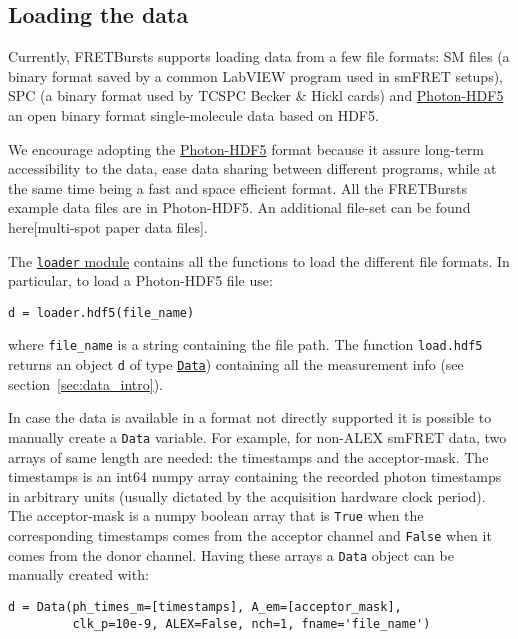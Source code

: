 \subsection{Loading the data}
Currently, FRETBursts supports loading data from a few file formats: SM files (a binary format saved by a common LabVIEW program used in smFRET setups), SPC (a binary format used by TCSPC Becker \& Hickl cards) and \href{http://photon-hdf5.readthedocs.org/}{Photon-HDF5}  an open binary format single-molecule data based on HDF5.

We encourage adopting the  \href{http://photon-hdf5.readthedocs.org/}{Photon-HDF5} format because it assure long-term accessibility to the data, ease data sharing  between different programs, while at the same time being a fast and space efficient format. All the FRETBursts example data files are in Photon-HDF5. An additional file-set can be found here[multi-spot paper data files].

The \href{http://fretbursts.readthedocs.org/en/latest/loader.html}{\texttt{loader} module}
contains all the functions to load the different file formats. In particular, to load a Photon-HDF5 file use:

\begin{verbatim}
d = loader.hdf5(file_name)
\end{verbatim}

where \verb|file_name| is a string containing the file path. The function \verb|load.hdf5| returns an object \verb|d| of type \href{http://fretbursts.readthedocs.org/en/latest/data_class.html}{\texttt{Data}}) containing all the measurement info (see section~\ref{sec:data_intro}).

In case the data is available in a format not directly supported it is possible to manually create a \verb|Data| variable. For example, for non-ALEX smFRET data, two arrays of same length are needed: the timestamps and the acceptor-mask. The timestamps is an int64 numpy array containing the recorded photon timestamps in arbitrary units (usually dictated by the acquisition hardware clock period). The acceptor-mask is a numpy boolean array that is \verb|True| when the corresponding timestamps comes from the acceptor channel and \verb|False| when it comes from the donor channel. Having these arrays a \verb|Data| object can be manually created with:

\begin{verbatim}
d = Data(ph_times_m=[timestamps], A_em=[acceptor_mask], 
         clk_p=10e-9, ALEX=False, nch=1, fname='file_name')
\end{verbatim}


